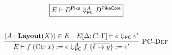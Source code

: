 \[
  \begin{array}{c}
    \fbox{$E \vdash D^{\Pika} \defStep^{A} D^{\PikaCore}$}
    \fboxNewlines
    \labinfer[PC-Def]{E \vdash f\; (\textrm{Ctr}\; \overline{x}) := e \defStep^{A} f\; \{ \overline{\ell \mapsto y} \} := e' }
      {(A : \Layout{X}) \in E
      &E[\Delta;C;\Gamma] \vdash e \pcStep e'
      }
  \end{array}
\]

%
%
%
%
%
